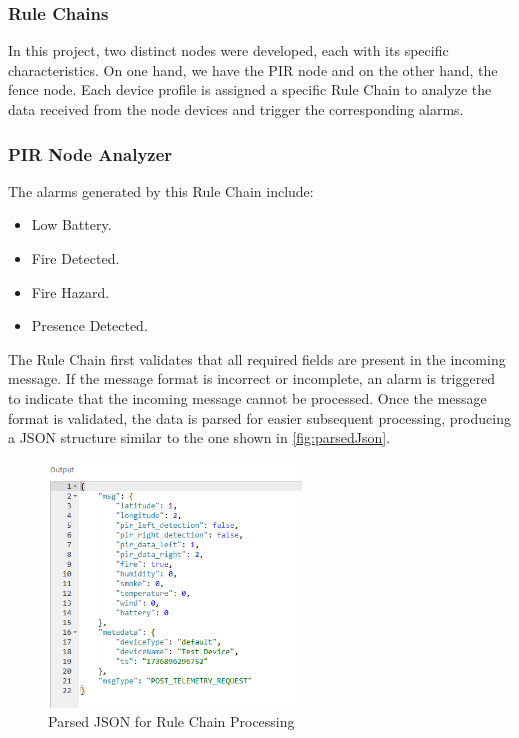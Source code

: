 \subsubsection*{Rule Chains}
In this project, two distinct nodes were developed, each with its specific characteristics. On one hand, we have the PIR node and on the other hand, the fence node. 
Each device profile is assigned a specific Rule Chain to analyze the data received from the node devices and trigger the corresponding alarms.

\clearpage
\subsubsection*{PIR Node Analyzer}
The alarms generated by this Rule Chain include:
\begin{itemize}
    \item Low Battery.
    \item Fire Detected.
    \item Fire Hazard.
    \item Presence Detected.
\end{itemize}

The Rule Chain first validates that all required fields are present in the incoming message. If the message format is incorrect or incomplete, an alarm is triggered 
to indicate that the incoming message cannot be processed. Once the message format is validated, the data is parsed for easier subsequent processing, producing a JSON
structure similar to the one shown in \autoref{fig:parsedJson}.

\begin{figure}[H]
    \centering
    \includegraphics[width=0.6\textwidth]{./images/8/jsonParsed.PNG}
    \caption{Parsed JSON for Rule Chain Processing}
    \label{fig:parsedJson}
\end{figure}

